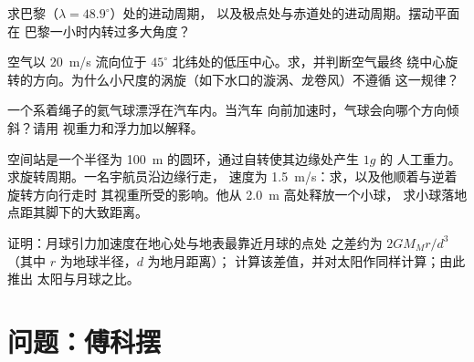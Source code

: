 \begin{exercise}[$\star\star$]\label{exo:b1:non-inertial-frames:8}
求巴黎（$\lambda = 48.9^\circ$）处的进动周期，
以及极点处与赤道处的进动周期。摆动平面在
巴黎一小时内转过多大角度？
\end{exercise}

\begin{exercise}[$\star\star$]\label{exo:b1:non-inertial-frames:9}
空气以 \qty{20}{m/s} 流向位于 $45^\circ$
北纬处的低压中心。求，并判断空气最终
绕中心旋转的方向。为什么小尺度的涡旋（如下水口的漩涡、龙卷风）不遵循
这一规律？
\end{exercise}

\begin{exercise}[$\star\star\star$]\label{exo:b1:non-inertial-frames:10}
一个系着绳子的氦气球漂浮在汽车内。当汽车
向前加速时，气球会向哪个方向倾斜？请用
视重力和浮力加以解释。
\end{exercise}

\begin{exercise}[$\star\star\star$]\label{exo:b1:non-inertial-frames:11}
空间站是一个半径为 \qty{100}{m} 的圆环，通过自转使其边缘处产生 $1g$ 的
人工重力。求旋转周期。一名宇航员沿边缘行走，
速度为 \qty{1.5}{m/s}：求，以及他顺着与逆着旋转方向行走时
其视重所受的影响。他从 \qty{2.0}{m} 高处释放一个小球，
求小球落地点距其脚下的大致距离。
\end{exercise}

\begin{exercise}[$\star\star\star$]\label{exo:b1:non-inertial-frames:12}
证明：月球引力加速度在地心处与地表最靠近月球的点处
之差约为
$2GM_Mr/d^3$（其中 $r$ 为地球半径，$d$ 为地月距离）；
计算该差值，并对太阳作同样计算；由此推出
太阳与月球之比。
\end{exercise}

\section{问题：傅科摆}

